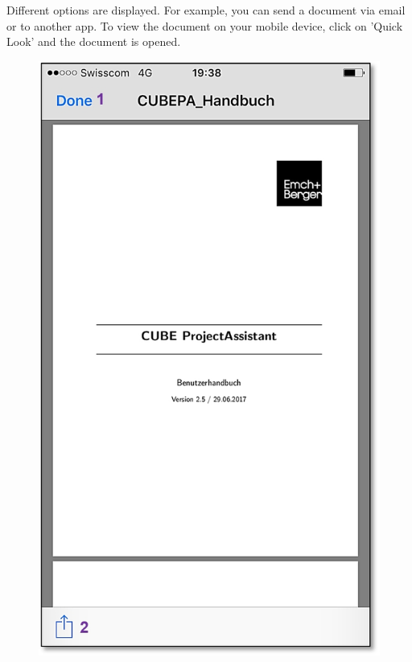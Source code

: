 Different options are displayed. For example, you can send a document via email or to another app. To view the document on your mobile device, click on 'Quick Look' and the document is opened.

\vspace{9.5cm}

\begin{figure}   %
  \vspace{-35pt}      %
  \begin{center}
    \includegraphics[width=1\linewidth]{../chapters/11_Dokumentenablage/pictures/11-mob07_Dokument_lesen_teilen.jpg}
  \end{center}
  \vspace{-20pt}
  \vspace{-10pt}
\end{figure}

